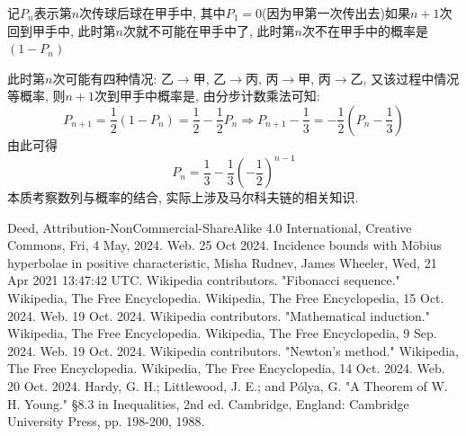 \documentclass{book}
\begin{document}
    记$P_n$表示第$n$次传球后球在甲手中, 其中$P_1=0$(因为甲第一次传出去)如果$n+1$次回到甲手中, 此时第$n$次就不可能在甲手中了, 此时\textcolor[rgb]{0.75,0.17,0.22}{第$n$次不在甲手中的概率是$(1-P_n)$}

    此时第$n$次可能有四种情况: 乙$\rightarrow$甲, 乙$\rightarrow$丙, 丙$\rightarrow$甲, 丙$\rightarrow$乙, 又该过程中情况等概率, 则$n+1$次到甲手中概率是, 由分步计数乘法可知:$$P_{n+1}=\frac{1}{2}\left( 1-P_n \right)=\frac{1}{2}-\frac{1}{2}P_n\Longrightarrow P_{n+1}-\frac{1}{3}=-\frac{1}{2}\left( P_n-\frac{1}{3} \right)$$由此可得$$P_n=\frac{1}{3}-\frac{1}{3}\left( -\frac{1}{2} \right)^{n-1}$$
本质考察数列与概率的结合, 实际上涉及\textcolor[rgb]{0.38,0.11,0.2}{马尔科夫链}的相关知识.

\begin{thebibliography}{99}
    Deed, Attribution-NonCommercial-ShareAlike 4.0 International, Creative Commons, Fri, 4 May, 2024. Web. 25 Oct 2024.
    Incidence bounds with Möbius hyperbolae in positive characteristic, Misha Rudnev, James Wheeler, Wed, 21 Apr 2021 13:47:42 UTC.
    Wikipedia contributors. "Fibonacci sequence." Wikipedia, The Free Encyclopedia. Wikipedia, The Free Encyclopedia, 15 Oct. 2024. Web. 19 Oct. 2024.
    Wikipedia contributors. "Mathematical induction." Wikipedia, The Free Encyclopedia. Wikipedia, The Free Encyclopedia, 9 Sep. 2024. Web. 19 Oct. 2024.
    Wikipedia contributors. "Newton's method." Wikipedia, The Free Encyclopedia. Wikipedia, The Free Encyclopedia, 14 Oct. 2024. Web. 20 Oct. 2024.
    Hardy, G. H.; Littlewood, J. E.; and Pólya, G. "A Theorem of W. H. Young." §8.3 in Inequalities, 2nd ed. Cambridge, England: Cambridge University Press, pp. 198-200, 1988.
\end{thebibliography}
\end{document}
